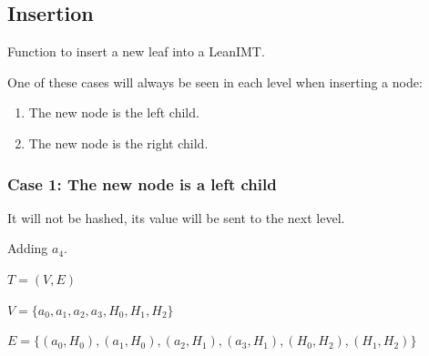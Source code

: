 \documentclass{article}
\begin{document}
\subsection{Insertion}

Function to insert a new leaf into a LeanIMT.

One of these cases will always be seen in each level when inserting a node:

\begin{enumerate}
    \item The new node is the left child.
    \item The new node is the right child.
\end{enumerate}

\subsubsection*{Case 1: The new node is a left child}

It will not be hashed, its value will be sent to the next level.

Adding $a_4$.

$T = (V,E)$

\raggedright



$V = \{a_0, a_1, a_2, a_3, H_0, H_1, H_2\}$



$E = \{(a_0, H_0), (a_1, H_0), (a_2, H_1), (a_3, H_1), (H_0, H_2), (H_1, H_2)\}$
\end{document}
